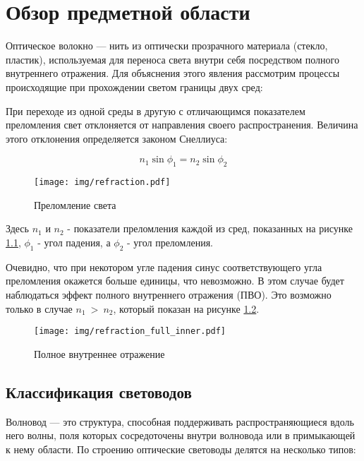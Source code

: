 \chapter{Обзор предметной области}
Оптическое волокно — нить из оптически прозрачного материала (стекло, пластик), используемая для переноса света внутри себя посредством полного внутреннего отражения. Для объяснения этого явления рассмотрим процессы происходящие при прохождении светом границы двух сред:

При переходе из одной среды в другую с отличающимся показателем преломления свет отклоняется от направления своего распространения. Величина этого отклонения определяется законом Снеллиуса:

\begin{equation}
 n_1 \sin\phi_1 = n_2 \sin\phi_2
 \label{snell}
\end{equation}

\begin{figure}[h!]
\texttt{[image: img/refraction.pdf]}
\caption{Преломление света}
\label{refraction}
\end{figure}
Здесь $n_1$ и $n_2$ - показатели преломления каждой из сред, показанных на рисунке \ref{refraction}, $\phi_1$ - угол падения, а $\phi_2$ - угол преломления.

Очевидно, что при некотором угле падения синус соответствующего угла преломления окажется больше единицы, что невозможно. В этом случае будет наблюдаться эффект полного внутреннего отражения (ПВО). Это возможно только в случае $n_1~>~n_2$, который показан на рисунке \ref{refraction_full_inner}.

\begin{figure}[h!]
\texttt{[image: img/refraction\_full\_inner.pdf]}
\caption{Полное внутреннее отражение}
\label{refraction_full_inner}
\end{figure}

\section{Классификация световодов}
Волновод — это структура, способная поддерживать распространяющиеся вдоль него волны, поля которых сосредоточены внутри волновода или в примыкающей к нему области. По строению оптические световоды делятся на несколько типов:

